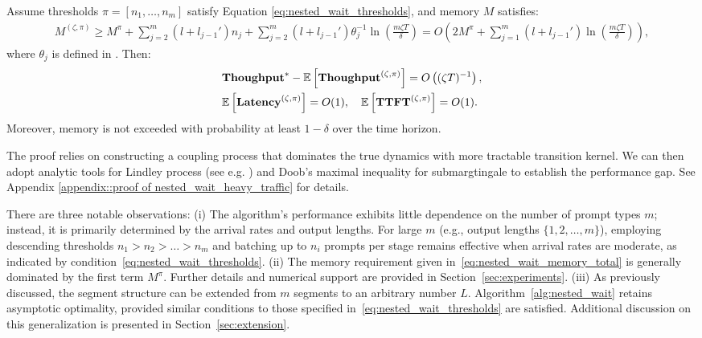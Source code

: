 \begin{theorem}
\label{thm:nested_wait_heavy_traffic}
Assume thresholds \( \pi = [n_1, \dots, n_m] \) satisfy Equation \eqref{eq:nested_wait_thresholds}, and memory \( M \) satisfies:
\begin{align}
\label{eq:nested_wait_memory_total}
    M^{(\zeta,\pi)} \geq M^\pi + \sum_{j=2}^m (l + l_{j-1}') n_j + \sum_{j=2}^m (l + l_{j-1}') \theta_j^{-1} \ln\left( \frac{m \zeta T}{\delta} \right) = O\left( 2M^\pi + \sum_{j=1}^m (l + l_{j-1}') \ln\left( \frac{m \zeta T}{\delta} \right) \right),
\end{align}
where \( \theta_j \) is defined in . Then:
\begin{align*}
&\textbf{Thoughput}^* - \mathbb{E}\left[ \textbf{Thoughput}^{(\zeta, \pi)} \right] = O\left( (\zeta T)^{-1} \right), \\
&\mathbb{E}\left[ \textbf{Latency}^{(\zeta, \pi)} \right] = O(1), \quad \mathbb{E}\left[ \textbf{TTFT}^{(\zeta, \pi)} \right] = O(1).
\end{align*}
Moreover, memory is not exceeded with probability at least \( 1 - \delta \) over the time horizon.
\end{theorem}

The proof relies on constructing a coupling process that dominates the true dynamics with more tractable transition kernel. We can then adopt analytic tools for Lindley process (see e.g. \cite{hill1982comparisons}) and Doob's maximal inequality for submargtingale to establish the performance gap. See Appendix \ref{appendix::proof of nested_wait_heavy_traffic} for details.

There are three notable observations: (i) The algorithm's performance exhibits little dependence on the number of prompt types \( m \); instead, it is primarily determined by the arrival rates and output lengths. For large \( m \) (e.g., output lengths \( \{1, 2, \dots, m\} \)), employing descending thresholds \( n_1 > n_2 > \dots > n_m \) and batching up to \( n_i \) prompts per stage remains effective when arrival rates are moderate, as indicated by condition~\eqref{eq:nested_wait_thresholds}. (ii) The memory requirement given in~\eqref{eq:nested_wait_memory_total} is generally dominated by the first term \( M^\pi \). Further details and numerical support are provided in Section~\ref{sec:experiments}. (iii) As previously discussed, the segment structure can be extended from \( m \) segments to an arbitrary number \( L \). Algorithm~\ref{alg:nested_wait} retains asymptotic optimality, provided similar conditions to those specified in~\eqref{eq:nested_wait_thresholds} are satisfied. Additional discussion on this generalization is presented in Section~\ref{sec:extension}.